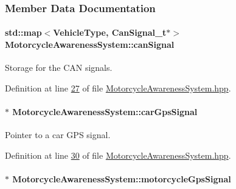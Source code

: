 \subsubsection{Member Data Documentation}
\hypertarget{classMotorcycleAwarenessSystem_a2d8ac602ae24dcf38aaa95a42ffb4e1f}{
\paragraph[{can\-Signal}]{\setlength{\rightskip}{0pt plus 5cm}std\-::map$<${\bf Vehicle\-Type}, {\bf Can\-Signal\-\_\-t}$\ast$$>$ Motorcycle\-Awareness\-System\-::can\-Signal\hspace{0.3cm}{\ttfamily [private]}}}\label{classMotorcycleAwarenessSystem_a2d8ac602ae24dcf38aaa95a42ffb4e1f}


Storage for the C\-A\-N signals. 



Definition at line \hyperlink{MotorcycleAwarenessSystem_8hpp_source_l00027}{27} of file \hyperlink{MotorcycleAwarenessSystem_8hpp_source}{Motorcycle\-Awareness\-System.\-hpp}.

\hypertarget{classMotorcycleAwarenessSystem_a9a8185e00b60d0be58bfa76166063128}{
\paragraph[{car\-Gps\-Signal}]{$\ast$ Motorcycle\-Awareness\-System\-::car\-Gps\-Signal\hspace{0.3cm}{\ttfamily [private]}}}\label{classMotorcycleAwarenessSystem_a9a8185e00b60d0be58bfa76166063128}


Pointer to a car G\-P\-S signal. 



Definition at line \hyperlink{MotorcycleAwarenessSystem_8hpp_source_l00030}{30} of file \hyperlink{MotorcycleAwarenessSystem_8hpp_source}{Motorcycle\-Awareness\-System.\-hpp}.

\hypertarget{classMotorcycleAwarenessSystem_ab281a3993b574923b2f379ed0477b2d4}{
\paragraph[{motorcycle\-Gps\-Signal}]{$\ast$ Motorcycle\-Awareness\-System\-::motorcycle\-Gps\-Signal\hspace{0.3cm}{\ttfamily [private]}}}\label{classMotorcycleAwarenessSystem_ab281a3993b574923b2f379ed0477b2d4}


